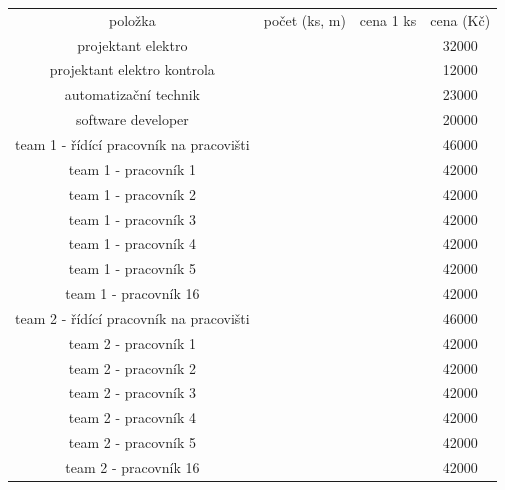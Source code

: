 \documentclass[a4paper, twoside, 11pt]{article}
\begin{document}
						\begin{table}[H]
				\begin{tabular}{ !{\vrule width 2pt} c | c | c | c  !{\vrule width 2pt}}
				položka & počet (ks, m) & cena 1 ks & cena (Kč)\\ 
				projektant elektro && 32000\\ \hline
				projektant elektro kontrola && 12000\\ \hline
				automatizační technik && 23000\\ \hline
				software developer & & 20000\\ \hline
				team 1 - řídící pracovník na pracovišti & & 46000\\ \hline
				team 1 - pracovník 1 & & 42000\\ \hline
				team 1 - pracovník 2 & & 42000\\ \hline
				team 1 - pracovník 3 & & 42000\\ \hline
				team 1 - pracovník 4 & & 42000\\ \hline
				team 1 - pracovník 5 & & 42000\\ \hline
				team 1 - pracovník 16 & & 42000\\ \hline
				
				team 2 - řídící pracovník na pracovišti && 46000\\ \hline
				team 2 - pracovník 1 && 42000\\ \hline
				team 2 - pracovník 2 && 42000\\ \hline
				team 2 - pracovník 3 && 42000\\ \hline
				team 2 - pracovník 4 && 42000\\ \hline
				team 2 - pracovník 5 && 42000\\ \hline
				team 2 - pracovník 16 && 42000\\ \hline
				

\end{tabular}
\end{table}
\end{document}
